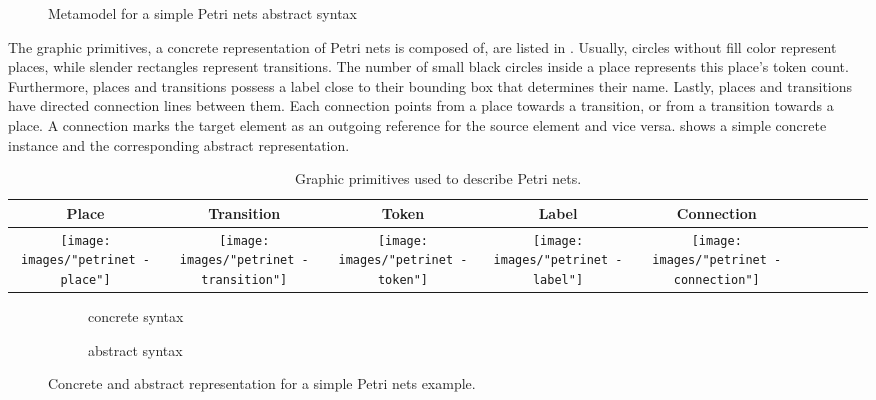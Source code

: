 \begin{figure}[H]
  \centering
  
  \caption{Metamodel for a simple Petri nets abstract syntax}
  \label{fig:petrinets_metamodel}
\end{figure}

The graphic primitives, a concrete representation of Petri nets is composed of, are listed in . Usually, circles without fill color represent places, while slender rectangles represent transitions. The number of small black circles inside a place represents this place's token count. Furthermore, places and transitions possess a label close to their bounding box that determines their name. Lastly, places and transitions have directed connection lines between them. Each connection points from a place towards a transition, or from a transition towards a place. A connection marks the target element as an outgoing reference for the source element and vice versa.  shows a simple concrete instance and the corresponding abstract representation.



\begin{table}[ht]
  \centering
\begin{tabular}[width=.1\linewidth]{| Sc | Sc | Sc | Sc | Sc |}
  \hline
  Place & Transition & Token & Label & Connection 
  \\
  \hline
  \texttt{[image: images/"petrinet - place"]} 
  & 
  \texttt{[image: images/"petrinet - transition"]} 
  & 
  \texttt{[image: images/"petrinet - token"]}
  & 
  \texttt{[image: images/"petrinet - label"]}
  & 
  \texttt{[image: images/"petrinet - connection"]} 
  \\
  \hline
\end{tabular}
\caption{Graphic primitives used to describe Petri nets.}
\label{tab:petri-primitives}
\end{table}

\begin{figure}[ht!]
  \centering
  \begin{subfigure}[t]{.4\textwidth}
    \centering
    
    \caption{concrete syntax}
    \label{subfig:petriconcrete}    
  \end{subfigure}
  \begin{subfigure}[t]{.45\textwidth}
    \centering
    
    \caption{abstract syntax}
    \label{subfig:petriabstract}    
  \end{subfigure}
  \caption{Concrete and abstract representation for a simple Petri nets example.}
  \label{fig:petrinets_example}
\end{figure} 

